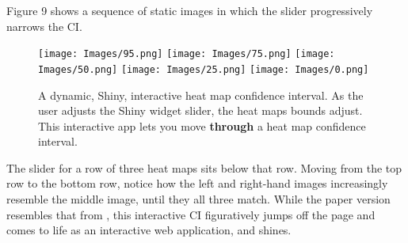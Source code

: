 Figure 9 shows a sequence of static images in which the slider progressively narrows the CI.
  \begin{figure}[H]
	\centering
	\texttt{[image: Images/95.png]}
	\texttt{[image: Images/75.png]}
	\texttt{[image: Images/50.png]}
	\texttt{[image: Images/25.png]}
	\texttt{[image: Images/0.png]}
	\caption{A dynamic, Shiny, interactive heat map confidence interval. As the user adjusts the Shiny widget slider, the heat maps bounds adjust. This interactive app lets you move {\bf through} a heat map confidence interval.}
	\end{figure}

The slider for a row of three heat maps sits below that row. Moving from the top row to the bottom row, notice how the left and right-hand images increasingly resemble the middle image, until they all three match. While the paper version resembles that from \cite{Cross2015}, this interactive CI figuratively jumps off the page and comes to life as an interactive web application, and shines.



% 
%
% 
